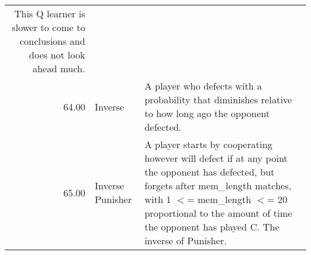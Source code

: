 \begin{table}[!hbtp]
\begin{adjustbox}{width=2\textwidth, angle=90}
\begin{tabular}{rll}
	This Q learner is slower to come to conclusions and does not look ahead much.                                                                                                                                                                                                                                                                                                                                                                                                                                                                                                                                                                                                                                                                                                                                                                                                                                                             \\
	64.00  & Inverse                     & A player who defects with a probability that diminishes relative to how
	long ago the opponent defected.                                                                                                                                                                                                                                                                                                                                                                                                                                                                                                                                                                                                                                                                                                                                                                                                                                                                                                              \\
	65.00  & Inverse Punisher            & A player starts by cooperating however will defect if at any point the
	opponent has defected, but forgets after mem\_length matches, with
	1 \ensuremath{<}= mem\_length \ensuremath{<}= 20 proportional to the amount of time the opponent
	has played C. The inverse of Punisher.                                                                                                                                                                                                                                                                                                                                                                                                                                                                                                                                                                                                                                                                                                                                                        \\

\end{tabular}
\end{adjustbox}
\end{table}
